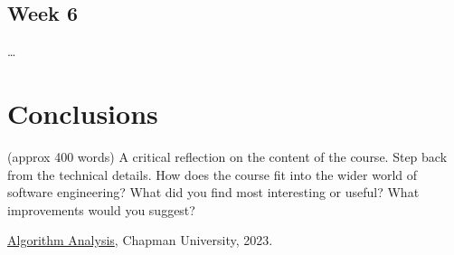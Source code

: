 \documentclass{article}
\theoremstyle{theorem}
\theoremstyle{definition}
\theoremstyle{remark}
\begin{document}
\subsection{Week 6}

 
\ldots

\section{Conclusions}\label{conclusions}

(approx 400 words) A critical reflection on the content of the course. Step back from the technical details. How does the course fit into the wider world of software engineering? What did you find most interesting or useful? 
What improvements would you suggest?

\begin{thebibliography}{99}
 \href{https://github.com/alexhkurz/algorithm-analysis-2023}{Algorithm Analysis}, Chapman University, 2023.
\end{thebibliography}
\end{document}

